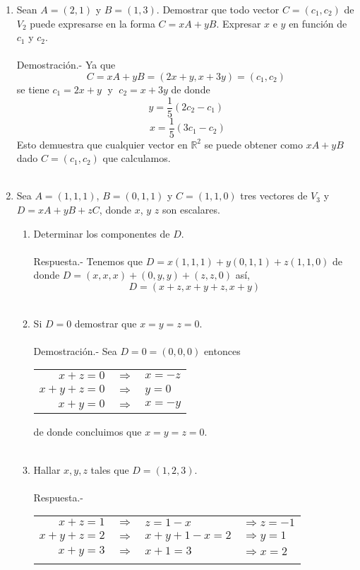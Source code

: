 \begin{enumerate}[\bfseries 1.]
\item Sean $A=(2,1)$ y $B=(1,3)$. Demostrar que todo vector $C=(c_1,c_2)$ de $V_2$ puede expresarse en la forma $C = xA+yB$. Expresar $x$ e $y$ en función de $c_1$ y $c_2$.\\\\
    Demostración.-\; Ya que $$C=xA+yB = (2x+y,x+3y)  = (c_1,c_2)$$
    se tiene $c_1 = 2x+y\;$ y $\;c_2 = x+3y$ de donde $$y=\dfrac{1}{5}(2c_2-c_1)$$  $$\;x=\dfrac{1}{5}(3c_1-c_2)$$
    Esto demuestra que cualquier vector en $\mathbb{R}^2$ se puede obtener como $xA+yB$ dado $C=(c_1,c_2)$ que calculamos.\\\\

\item Sea $A=(1,1,1)$, $B=(0,1,1)$ y $C=(1,1,0)$ tres vectores de $V_3$ y $D=xA+yB+zC$, donde $x$, $y$ $z$ son escalares.
\begin{enumerate}[\bfseries a)]

    \item Determinar los componentes de $D$.\\\\
	Respuesta.-\; Tenemos que $D=x(1,1,1)+y(0,1,1)+z(1,1,0)$ de donde $D=(x,x,x)+(0,y,y)+(z,z,0)$
	así, $$D=(x+z,x+y+z,x+y)$$\\

    \item Si $D=0$ demostrar que $x=y=z=0$.\\\\
	Demostración.-\; Sea $D=0=(0,0,0)$ entonces 
	\begin{center}
	    \begin{tabular}{rcl}
		$x+z=0$&$\Longrightarrow$&$x=-z$\\	
		$x+y+z=0$&$\Longrightarrow$&$y=0$\\
		$x+y=0$&$\Longrightarrow$&$x=-y$\\
	    \end{tabular}
	\end{center}
	de donde concluimos que $x=y=z=0$.\\\\

    \item Hallar $x, y, z$ tales que $D=(1,2,3)$.\\\\
	Respuesta.-\; 
	\begin{center}
	    \begin{tabular}{rcll}
		$x+z=1$&$\Longrightarrow$&$z=1-x$&$\Longrightarrow z=-1$\\
		$x+y+z=2$&$\Longrightarrow$&$x+y+1-x=2$&$\Longrightarrow y=1$\\
		$x+y=3$&$\Longrightarrow$&$x+1=3$&$\Longrightarrow x=2$\\\\
	    \end{tabular}
	\end{center}


\end{enumerate}
\end{enumerate}
